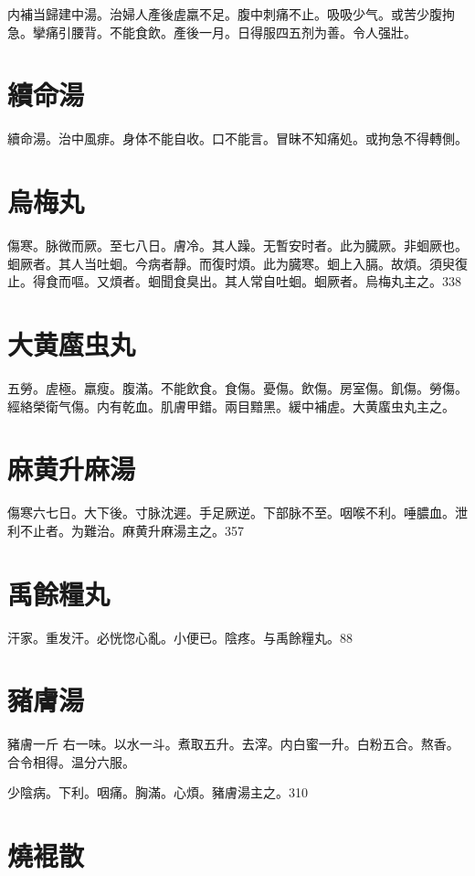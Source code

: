 \documentclass[b5paper,twoside,zihao=-4,UTF8]{ctexbook}
\begin{document}
内補当歸建中湯。治婦人產後虗羸不足。腹中刺痛不止。吸吸少气。或苦少腹拘急。攣痛引腰背。不能食飲。產後一月。日得服四五剂为善。令人强壯。

\section{續命湯}

續命湯。治中風痱。身体不能自收。口不能言。冒昧不知痛処。或拘急不得轉側。

\section{烏梅丸}

傷寒。脉微而厥。至七八日。膚冷。其人躁。无暫安时者。此为臓厥。非蛔厥也。蛔厥者。其人当吐蛔。今病者靜。而復时煩。此为臓寒。蛔上入膈。故煩。須臾復止。得食而嘔。又煩者。蛔聞食臭出。其人常自吐蛔。蛔厥者。烏梅丸主之。338

\section{大黄䗪虫丸}

五勞。虗極。羸瘦。腹滿。不能飲食。食傷。憂傷。飲傷。房室傷。飢傷。勞傷。經絡榮衛气傷。内有乾血。肌膚甲錯。兩目黯黑。緩中補虗。大黄䗪虫丸主之。

\section{麻黄升麻湯}

傷寒六七日。大下後。{寸}脉沈遲。手足厥逆。下部脉不至。咽喉不利。唾膿血。泄利不止者。为難治。麻黄升麻湯主之。357

\section{禹餘糧丸}

汗家。重发汗。必恍惚心亂。小便已。陰疼。与禹餘糧丸。88

\section{豬膚湯}

豬膚{\scriptsize 一斤}
右一味。以水一斗。煮取五升。去滓。内白蜜一升。白粉五合。熬香。合令相得。温分六服。

少陰病。下利。咽痛。胸滿。心煩。豬膚湯主之。310

\section{燒裩散}
\end{document}
